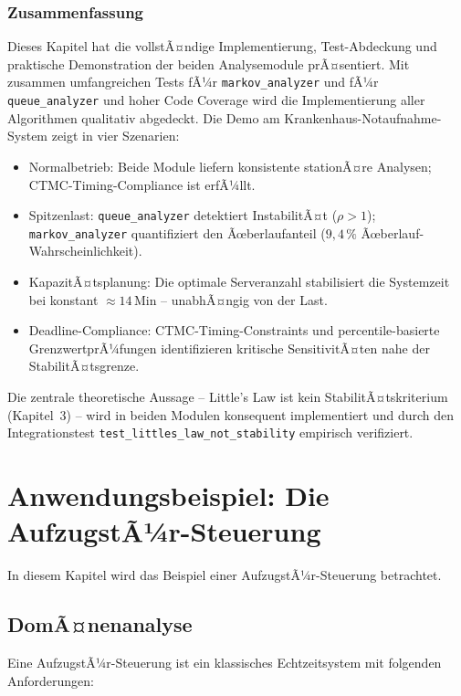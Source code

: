 ﻿\documentclass[a4paper,12pt]{report}
\theoremstyle{definition}
\begin{document}
\subsection{Zusammenfassung}

Dieses Kapitel hat die vollstÃ¤ndige Implementierung, Test-Abdeckung und
praktische Demonstration der beiden Analysemodule prÃ¤sentiert.
Mit zusammen umfangreichen Tests fÃ¼r \texttt{markov\_analyzer} und fÃ¼r
\texttt{queue\_analyzer} und hoher Code Coverage wird die
Implementierung aller Algorithmen qualitativ abgedeckt. Die Demo am
Krankenhaus-Notaufnahme-System zeigt in vier Szenarien:

\begin{itemize}
	\item[-] Normalbetrieb: Beide Module liefern konsistente stationÃ¤re
	Analysen; CTMC-Timing-Compliance ist erfÃ¼llt.
	\item[-] Spitzenlast: \texttt{queue\_analyzer} detektiert InstabilitÃ¤t
	($\rho > 1$); \texttt{markov\_analyzer} quantifiziert den Ãœberlaufanteil
	($9{,}4\,\%$ Ãœberlauf-Wahrscheinlichkeit).
	\item[-] KapazitÃ¤tsplanung: Die optimale Serveranzahl stabilisiert
	die Systemzeit bei konstant $\approx 14$\,Min -- unabhÃ¤ngig von der Last.
	\item[-] Deadline-Compliance: CTMC-Timing-Constraints und percentile-basierte
	GrenzwertprÃ¼fungen identifizieren kritische SensitivitÃ¤ten nahe der
	StabilitÃ¤tsgrenze.
\end{itemize}

Die zentrale theoretische Aussage -- Little's Law ist kein StabilitÃ¤tskriterium
(Kapitel~3) -- wird in beiden Modulen konsequent implementiert und durch
den Integrationstest \texttt{test\_littles\_law\_not\_stability} empirisch
verifiziert.

\chapter{Anwendungsbeispiel: Die AufzugstÃ¼r-Steuerung}
\label{ch:aufzugstuer}

In diesem Kapitel wird das Beispiel einer AufzugstÃ¼r-Steuerung betrachtet.

\section{DomÃ¤nenanalyse}

Eine AufzugstÃ¼r-Steuerung ist ein klassisches Echtzeitsystem mit folgenden Anforderungen:
\end{document}
